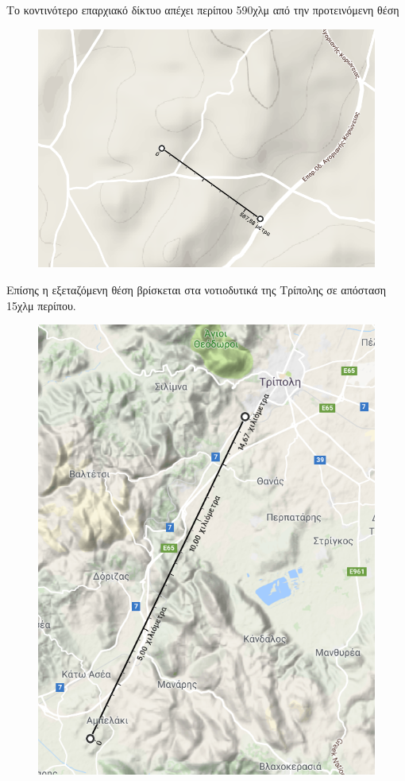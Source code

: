 \documentclass[12pt]{article}
\begin{document}
 	Το κοντινότερο επαρχιακό δίκτυο απέχει περίπου 590χλμ από την προτεινόμενη θέση
 	
 	\begin{figure} [H]
 		\begin{center}
 			\includegraphics [scale = 0.50] {map32.png}
 		\end{center}
 	\end{figure}
 
 	Επίσης η εξεταζόμενη θέση βρίσκεται στα νοτιοδυτικά της Τρίπολης σε απόσταση 15χλμ περίπου.
 	
 	\begin{figure} [H]
 		\begin{center}
 			\includegraphics [scale = 0.50] {map33.png}
 		\end{center}
 	\end{figure}
 	
\end{document}
